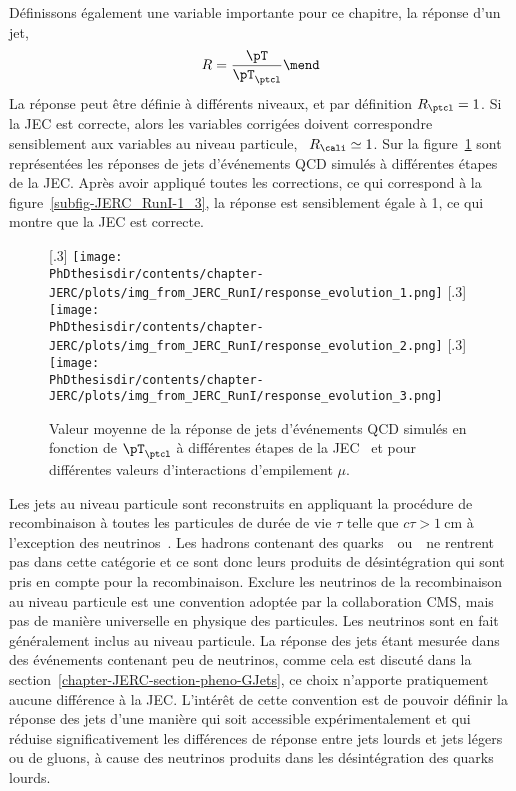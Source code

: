 Définissons également une variable importante pour ce chapitre, la réponse d'un jet,
\begin{equation}
R = \frac{\pT}{\pT_\ptcl}
\mend
\end{equation}
La réponse peut être définie à différents niveaux, et par définition $R_\ptcl=1$.
Si la JEC est correcte, alors les variables corrigées doivent correspondre sensiblement aux variables au niveau particule, \ie\ $R_\cali\simeq1$.
Sur la figure~\ref{fig-JERC_RunI-1} sont représentées les réponses de jets d'événements QCD simulés à différentes étapes de la JEC. Après avoir appliqué toutes les corrections, ce qui correspond à la figure~\ref{subfig-JERC_RunI-1_3}, la réponse est sensiblement égale à 1, ce qui montre que la JEC est correcte.
\begin{figure}[h]
\centering
{}[.3\textwidth]
{\texttt{[image: \\PhDthesisdir/contents/chapter-JERC/plots/img\_from\_JERC\_RunI/response\_evolution\_1.png]}}
\hfill
{}[.3\textwidth]
{\texttt{[image: \\PhDthesisdir/contents/chapter-JERC/plots/img\_from\_JERC\_RunI/response\_evolution\_2.png]}}
\hfill
{}[.3\textwidth]
{\texttt{[image: \\PhDthesisdir/contents/chapter-JERC/plots/img\_from\_JERC\_RunI/response\_evolution\_3.png]}}
\caption[Valeur moyenne de la réponse de jets d'événements QCD simulés.]{Valeur moyenne de la réponse de jets d'événements QCD simulés en fonction de $\pT_\ptcl$ à différentes étapes de la JEC~\cite{JERC_RunI} et pour différentes valeurs d'interactions d'empilement $\mu$.}
\label{fig-JERC_RunI-1}
\end{figure}
\par Les jets au niveau particule sont reconstruits en appliquant la procédure de recombinaison à toutes les particules de durée de vie $\tau$ telle que $c\tau>\SI{1}{\centi\meter}$ à l'exception des neutrinos~\cite{JERC_RunI}.
Les hadrons contenant des quarks~\quarkc\ ou~\quarkb\ ne rentrent pas dans cette catégorie et ce sont donc leurs produits de désintégration qui sont pris en compte pour la recombinaison.
Exclure les neutrinos de la recombinaison au niveau particule est une convention adoptée par la collaboration CMS, mais pas de manière universelle en physique des particules.
Les neutrinos sont en fait généralement inclus au niveau particule.
La réponse des jets étant mesurée dans des événements contenant peu de neutrinos, comme cela est discuté dans la section~\ref{chapter-JERC-section-pheno-GJets}, ce choix n'apporte pratiquement aucune différence à la JEC.
L'intérêt de cette convention est de pouvoir définir la réponse des jets d'une manière qui soit accessible expérimentalement et qui réduise significativement les différences de réponse entre jets lourds et jets légers ou de gluons, à cause des neutrinos produits dans les désintégration des quarks lourds.
